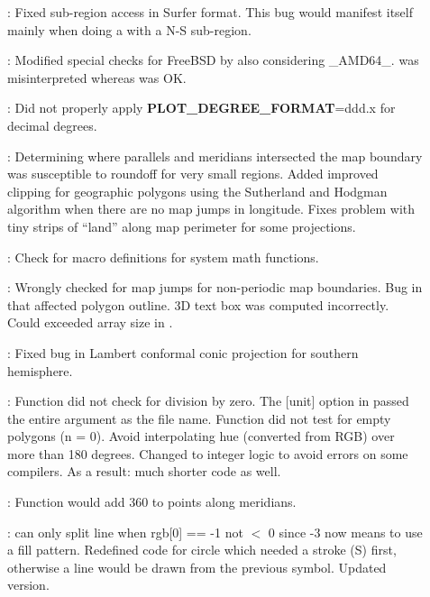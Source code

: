 \begin{description}
	\item []: Fixed sub-region access in Surfer format. This bug would 
		manifest itself mainly when doing a  with a N-S sub-region.
	\item []: Modified special checks for FreeBSD by also considering \_AMD64\_.
	 was misinterpreted whereas  was OK.
	\item []: Did not properly apply {\bf PLOT\_DEGREE\_FORMAT}=ddd.x for decimal degrees.
	\item []: Determining where parallels and meridians intersected the map
		boundary was susceptible to roundoff for very small regions.
		Added improved clipping for geographic polygons using
		the Sutherland and Hodgman algorithm when there are no map
		jumps in longitude.  Fixes problem with tiny strips of
		``land'' along map perimeter for some projections.
	\item []: Check for macro definitions for system math functions.
	\item []: Wrongly checked for map jumps for non-periodic map boundaries.
		Bug in  that affected polygon outline.
		3D text box was computed incorrectly.  Could exceeded array size in .
	\item []: Fixed bug in Lambert conformal conic projection for southern hemisphere.
	\item []: Function  did not check for division by zero.
			The [unit] option in  passed the entire
			argument as the file name. Function  did not test for empty polygons (n = 0).
			Avoid interpolating hue (converted from RGB) over more than 180 degrees.
			Changed  to integer logic to avoid errors on
			some compilers. As a result: much shorter code as well.
	\item []: Function  would add 360 to points along meridians.
	\item []:  can only split line when rgb[0] == -1 not $<$ 0
		since -3 now means to use a fill pattern.  Redefined \PS code for circle which needed a stroke (S) first, otherwise
		a line would be drawn from the previous symbol.  Updated  version.

\end{description}
